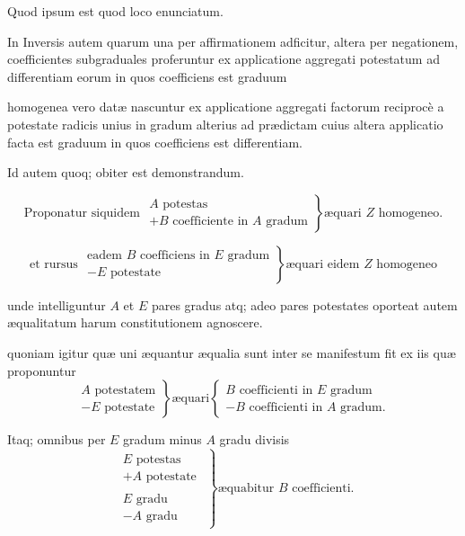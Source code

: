 \documentclass[11pt,a4paper]{article}
\begin{document}
Quod ipsum est quod  loco enunciatum.

In Inversis autem quarum una per affirmationem adficitur, altera per negationem, coefficientes subgraduales proferuntur ex applicatione aggregati potestatum ad differentiam eorum in quos coefficiens est graduum

homogenea vero datæ nascuntur ex applicatione aggregati factorum reciprocè a potestate radicis unius in gradum alterius ad prædictam cuius altera applicatio facta est graduum in quos coefficiens est differentiam.

Id autem quoq; obiter est demonstrandum.

\[ \text{Proponatur siquidem } \left.\begin{array}{l} A \text{ potestas} \\ + B \text{ coefficiente in } A \text{ gradum} \end{array}\right\} \text{æquari } Z \text{ homogeneo.} \]

\[ \text{et rursus } \left.\begin{array}{l} \text{eadem } B \text{ coefficiens in } E \text{ gradum} \\ - E \text{ potestate} \end{array}\right\} \text{æquari eidem } Z \text{ homogeneo} \]

unde intelliguntur $A$ et $E$ pares gradus atq; adeo pares potestates oporteat autem æqualitatum harum constitutionem agnoscere.

quoniam igitur quæ uni æquantur æqualia sunt inter se manifestum fit ex iis quæ proponuntur
\[ \left.\begin{array}{l} A \text{ potestatem} \\ - E \text{ potestate} \end{array}\right\} \text{æquari} \left\{\begin{array}{l} B \text{ coefficienti in } E \text{ gradum} \\ - B \text{ coefficienti in } A \text{ gradum.} \end{array}\right. \]

Itaq; omnibus per $E$ gradum minus $A$ gradu divisis
\[ \left.\begin{array}{c} \begin{array}{l} E \text{ potestas} \\ + A \text{ potestate} \end{array} \\ \hline \begin{array}{l} E \text{ gradu} \\ - A \text{ gradu} \end{array} \end{array}\right\} \text{æquabitur } B \text{ coefficienti.} \]
\end{document}
